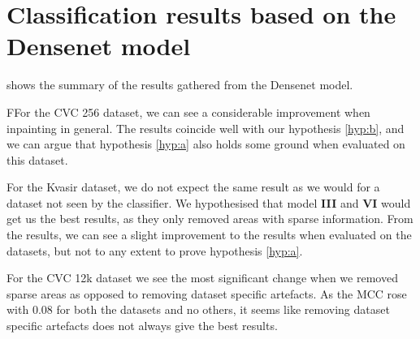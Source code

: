 \FloatBarrier





\section{Classification results based on the Densenet model}
 shows the summary of the results gathered from the Densenet model.

FFor the CVC 256 dataset, we can see a considerable improvement when inpainting in general. The results coincide well with our hypothesis \ref{hyp:b}, and we can argue that hypothesis \ref{hyp:a} also holds some ground when evaluated on this dataset.

For the Kvasir dataset, we do not expect the same result as we would for a dataset not seen by the classifier. We hypothesised that model \textbf{III} and \textbf{VI} would get us the best results, as they only removed areas with sparse information. From the results, we can see a slight improvement to the results when evaluated on the datasets, but not to any extent to prove hypothesis \ref{hyp:a}.

For the CVC 12k dataset we see the most significant change when we removed sparse areas as opposed to removing dataset specific artefacts. As the MCC rose with 0.08 for both the datasets and no others, it seems like removing dataset specific artefacts does not always give the best results.


